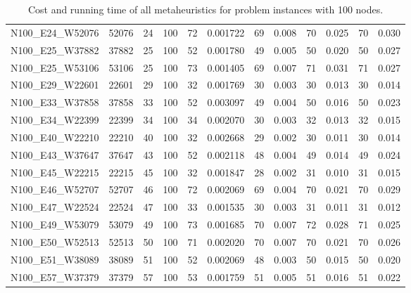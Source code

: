 \begin{landscape}
\begin{table}
\begin{tabular}{lrrrrrrrrrrr}
N100\_E24\_W52076 &        52076 &    24 &   100 &   72 &  0.001722 &     69 &   0.008 &    70 &   0.025 &   70 &   0.030 \\
N100\_E25\_W37882 &        37882 &    25 &   100 &   52 &  0.001780 &     49 &   0.005 &    50 &   0.020 &   50 &   0.027 \\
N100\_E25\_W53106 &        53106 &    25 &   100 &   73 &  0.001405 &     69 &   0.007 &    71 &   0.031 &   71 &   0.027 \\
N100\_E29\_W22601 &        22601 &    29 &   100 &   32 &  0.001769 &     30 &   0.003 &    30 &   0.013 &   30 &   0.014 \\
N100\_E33\_W37858 &        37858 &    33 &   100 &   52 &  0.003097 &     49 &   0.004 &    50 &   0.016 &   50 &   0.023 \\
N100\_E34\_W22399 &        22399 &    34 &   100 &   34 &  0.002070 &     30 &   0.003 &    32 &   0.013 &   32 &   0.015 \\
N100\_E40\_W22210 &        22210 &    40 &   100 &   32 &  0.002668 &     29 &   0.002 &    30 &   0.011 &   30 &   0.014 \\
N100\_E43\_W37647 &        37647 &    43 &   100 &   52 &  0.002118 &     48 &   0.004 &    49 &   0.014 &   49 &   0.024 \\
N100\_E45\_W22215 &        22215 &    45 &   100 &   32 &  0.001847 &     28 &   0.002 &    31 &   0.010 &   31 &   0.015 \\
N100\_E46\_W52707 &        52707 &    46 &   100 &   72 &  0.002069 &     69 &   0.004 &    70 &   0.021 &   70 &   0.029 \\
N100\_E47\_W22524 &        22524 &    47 &   100 &   33 &  0.001535 &     30 &   0.003 &    31 &   0.011 &   31 &   0.012 \\
N100\_E49\_W53079 &        53079 &    49 &   100 &   73 &  0.001685 &     70 &   0.007 &    72 &   0.028 &   71 &   0.025 \\
N100\_E50\_W52513 &        52513 &    50 &   100 &   71 &  0.002020 &     70 &   0.007 &    70 &   0.021 &   70 &   0.026 \\
N100\_E51\_W38089 &        38089 &    51 &   100 &   52 &  0.002069 &     48 &   0.003 &    50 &   0.015 &   50 &   0.020 \\
N100\_E57\_W37379 &        37379 &    57 &   100 &   53 &  0.001759 &     51 &   0.005 &    51 &   0.016 &   51 &   0.022 \\
\bottomrule
\end{tabular}
\caption{Cost and running time of all metaheuristics for problem instances with 100 nodes.}
\label{table:100-results}
\end{table}


\end{landscape}

